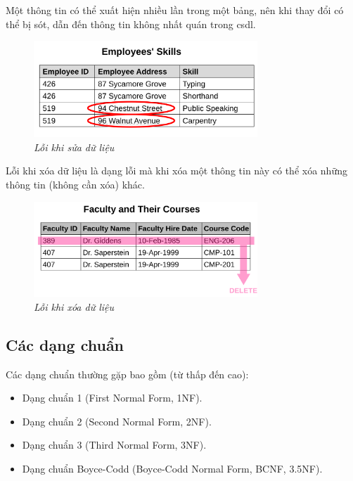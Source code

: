 \documentclass[11pt]{beamer}
\begin{document}
\begin{frame}
  Một thông tin có thể xuất hiện nhiều lần trong một bảng, nên khi thay đổi có thể bị sót, 
  dẫn đến thông tin không nhất quán trong csdl.
  \begin{figure}
    \includegraphics[width=0.75\textwidth]{COS212/ua.png}
    \caption{\textit{Lỗi khi sửa dữ liệu}}
  \end{figure}
\end{frame}

\begin{frame}
  Lỗi khi xóa dữ liệu là dạng lỗi mà khi xóa một thông tin này có thể xóa những 
  thông tin (không cần xóa) khác.
  \begin{figure}
    \includegraphics[width=0.75\textwidth]{COS212/da.png}
    \caption{\textit{Lỗi khi xóa dữ liệu}}
  \end{figure}
\end{frame}

\subsection{Các dạng chuẩn}
\begin{frame}
  Các dạng chuẩn thường gặp bao gồm (từ thấp đến cao):
  \begin{itemize}
    \item Dạng chuẩn 1 (First Normal Form, 1NF).
    \item Dạng chuẩn 2 (Second Normal Form, 2NF).
    \item Dạng chuẩn 3 (Third Normal Form, 3NF).
    \item Dạng chuẩn Boyce-Codd (Boyce-Codd Normal Form, BCNF, 3.5NF). 
  \end{itemize}
\end{frame}
\end{document}
